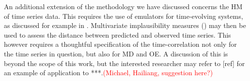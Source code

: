 \documentclass[preprint,12pt, sort&compress]{elsarticle}
\newcommand{\red}[1]{\textcolor{red}{#1}}
\begin{document}
An additional extension of the methodology we have discussed concerns the HM of time series data. This requires the use of emulators for time-evolving systems, as discussed for example in \cite{conti2009}. Multivariate implausibility measures (\cite{vernon2010galaxy, cumming2010}) may then be used to assess the distance between predicted and observed time series. This however requires a thoughtful specification of the time-correlation not only for the time series in question, but also for MD and OE. A discussion of this is beyond the scope of this work, but the interested researcher may refer to [ref]  for an example of application to ***.\red{(Michael, Hailiang, suggestion here?)}





 

\end{document}
